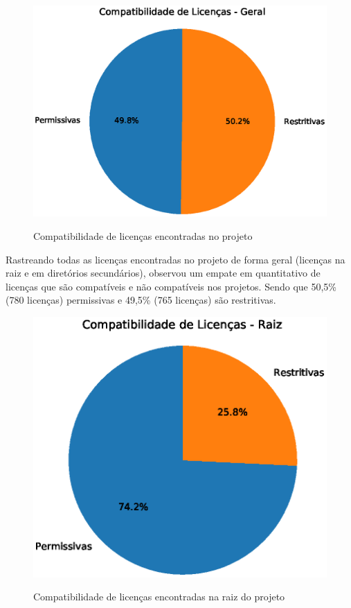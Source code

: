 \begin{figure}[H]
    \centering
    \caption{Compatibilidade de licenças encontradas no projeto}
    \includegraphics[scale=0.8]{figuras/resultados/pizza_compatibilidade_geral.eps}
    \label{local-licencas-raiz}
\end{figure}

Rastreando todas as licenças encontradas no projeto de forma geral (licenças na raiz e em diretórios secundários), observou um empate em quantitativo de licenças que são compatíveis e não compatíveis nos projetos. Sendo que 50,5\% (780 licenças) permissivas e 49,5\% (765 licenças) são restritivas.

\begin{figure}[H]
    \centering
    \caption{Compatibilidade de licenças encontradas na raiz do projeto}
    \includegraphics[scale=0.8]{figuras/resultados/pizza_compatibilidade_raiz.eps}
    \label{local-licencas-raiz}
\end{figure}

